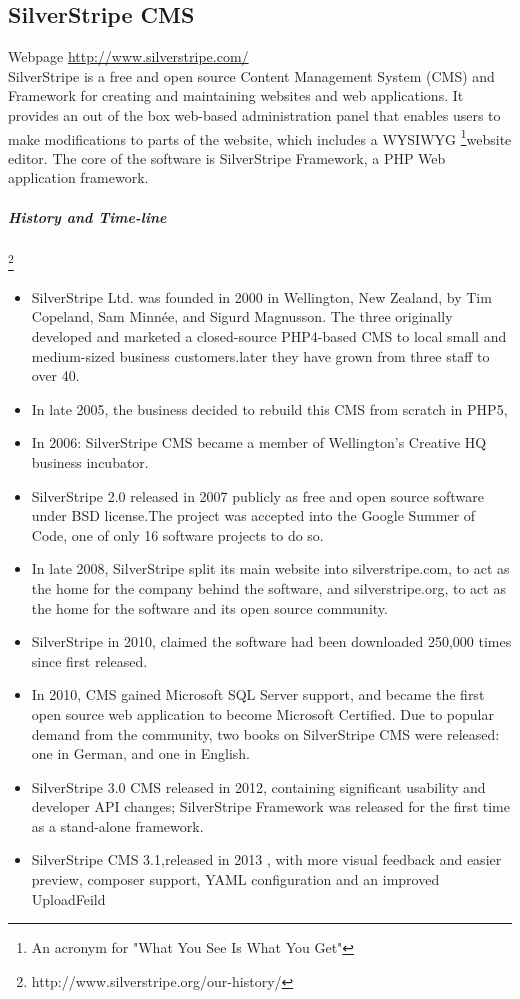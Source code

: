 \documentclass[11pt]{article} %
\begin{document}

\subsection{SilverStripe CMS} 
Webpage \url{http://www.silverstripe.com/}\\
   SilverStripe is a free and open source Content Management System (CMS) and Framework for creating and maintaining websites and web applications. It provides an out of the box web-based administration panel that enables users to make modifications to parts of the website, which includes a WYSIWYG \footnote{ An acronym for "What You See Is What You Get"}website editor. The core of the software is SilverStripe Framework, a PHP Web application framework.
  
  \subparagraph{History and Time-line}\footnote{http://www.silverstripe.org/our-history/}
\begin{itemize}
\item SilverStripe Ltd. was founded in 2000 in Wellington, New Zealand, by Tim Copeland, Sam Minnée, and Sigurd Magnusson. The three originally developed and marketed a closed-source PHP4-based CMS to local small and medium-sized business customers.later they have grown from three staff to over 40.
\item In late 2005, the business decided to rebuild this CMS from scratch in PHP5,
\item In 2006: SilverStripe CMS became a member of Wellington’s Creative HQ business incubator.
\item SilverStripe 2.0 released in 2007 publicly as free and open source software under BSD license.The project was accepted into the Google Summer of Code, one of only 16 software projects to do so.
\item In late 2008, SilverStripe split its main website into silverstripe.com, to act as the home for the company behind the software, and silverstripe.org, to act as the home for the software and its open source community.
\item SilverStripe in 2010, claimed the software had been downloaded 250,000 times since first released.
\item In 2010, CMS gained Microsoft SQL Server support, and became the first open source web application to become Microsoft Certified. Due to popular demand from the community, two books on SilverStripe CMS were released: one in German, and one in English.

\item SilverStripe 3.0 CMS released in 2012, containing significant usability and developer API changes; SilverStripe Framework was released for the first time as a stand-alone framework.
\item SilverStripe CMS 3.1,released in 2013 , with more visual feedback and easier preview, composer support, YAML configuration and an improved UploadFeild


\end{itemize}
\end{document}
